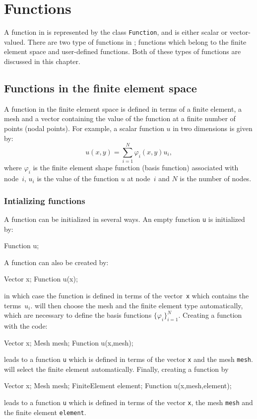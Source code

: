 \chapter{Functions}


A function in \dolfin{} is represented by the class \texttt{Function}, and
is either scalar or vector-valued. There are two type of functions in \dolfin{};
functions which belong to the finite element space and user-defined functions.
Both of these types of functions are discussed in this chapter. 



\section{Functions in the finite element space}
%
A function in the finite element space is defined in terms of a finite
element, a mesh and a vector containing the value of the function at a
finite number of points (nodal points). For example, a scalar function $u$ in
two dimensions is given by:
\begin{equation}
  u(x,y) = \sum_{i=1}^{N} \varphi_{i}(x,y) u_{i},
\end{equation}
where $\varphi_{i}$ is the finite element shape function (basis function)
associated with node~$i$, $u_{i}$ is the value of the function $u$ at node~$i$
and $N$ is the number of nodes. 

\subsection{Intializing functions}
A function can be initialized in several ways. An empty function \texttt{u}
is initialized by:
\begin{code}
  Function u;
\end{code}
A function can also be created by:
\begin{code}
  Vector x;
  Function u(x);
\end{code}
in which case the function is defined in terms of the vector~\texttt{x} which
contains the terms~$u_{i}$. \dolfin{} will then choose the mesh and the finite
element type automatically, which are necessary to define the basis functions
$\{\varphi_{i}\}_{i=1}^{N}$. Creating a function with the code:
\begin{code}
  Vector x;
  Mesh mesh;
  Function u(x,mesh);
\end{code}
leads to a function \texttt{u} which is defined in terms of the vector
\texttt{x} and the mesh \texttt{mesh}. \dolfin{} will select the finite element
automatically. Finally, creating a function by 
\begin{code}
  Vector x;
  Mesh mesh;
  FiniteElement element;
  Function u(x,mesh,element);
\end{code}
leads to a function \texttt{u} which is defined in terms of the vector
\texttt{x}, the mesh \texttt{mesh} and the finite element \texttt{element}.

